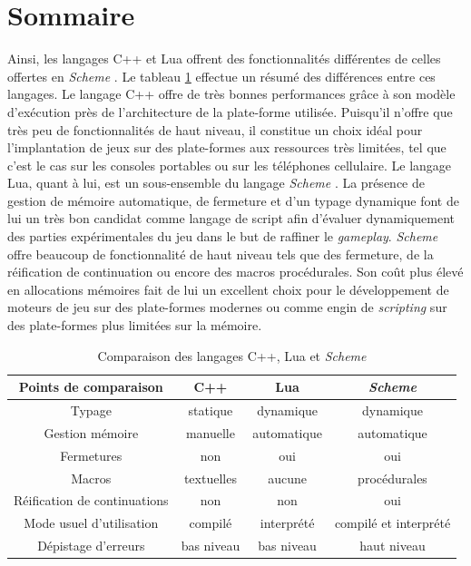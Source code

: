 \documentclass[12pt,twoside,letterpaper,francais]{book}
\newcommand{\Schemelang}{{\textit{Scheme }}}
\begin{document}
\section{Sommaire}
Ainsi, les langages C++ et Lua offrent des fonctionnalités différentes
de celles offertes en \Schemelang. Le tableau \ref{Rev:lang-comp}
effectue un résumé des différences entre ces langages. Le langage C++
offre de très bonnes performances grâce à son modèle d'exécution près
de l'architecture de la plate-forme utilisée. Puisqu'il n'offre que
très peu de fonctionnalités de haut niveau, il constitue un choix
idéal pour l'implantation de jeux sur des plate-formes aux ressources
très limitées, tel que c'est le cas sur les consoles portables ou sur
les téléphones cellulaire. Le langage Lua, quant à lui, est un
sous-ensemble du langage \Schemelang. La présence de gestion de
mémoire automatique, de fermeture et d'un typage dynamique font de lui
un très bon candidat comme langage de script afin d'évaluer
dynamiquement des parties expérimentales du jeu dans le but de
raffiner le \textit{gameplay}. \Schemelang offre beaucoup de
fonctionnalité de haut niveau tels que des fermeture, de la
réification de continuation ou encore des macros procédurales. Son
coût plus élevé en allocations mémoires fait de lui un excellent choix
pour le développement de moteurs de jeu sur des plate-formes modernes
ou comme engin de \textit{scripting} sur des plate-formes plus
limitées sur la mémoire.

\begin{table}
\begin{tabular}{cccc}
Points de comparaison         & C++ & Lua & \Schemelang\\
\hline \hline
Typage                       & statique & dynamique & dynamique\\
Gestion mémoire              & manuelle & automatique & automatique\\
Fermetures                   & non & oui & oui\\
Macros                       & textuelles & aucune & procédurales\\
Réification de continuations & non & non & oui\\
Mode usuel d'utilisation     & compilé & interprété & compilé et interprété\\
Dépistage d'erreurs          & bas niveau & bas niveau & haut niveau\\
\hline
\end{tabular}
\caption{Comparaison des langages C++, Lua et \Schemelang}
\label{Rev:lang-comp}
\end{table}
\end{document}

